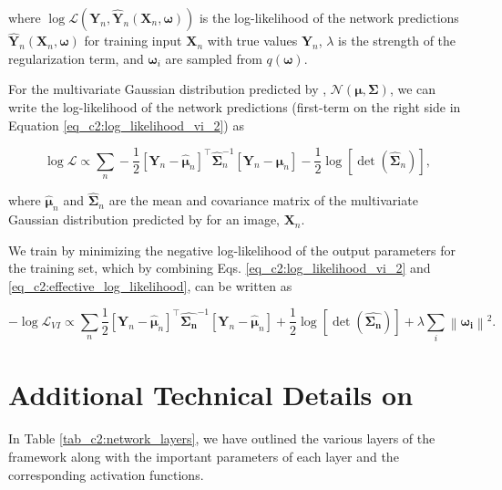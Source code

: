 \noindent
where $\log \mathcal{L}\left(\boldsymbol{Y}_{n}, \boldsymbol{\hat{Y}}_{n}\left(\boldsymbol{X}_{n}, \boldsymbol{\omega}\right)\right)$ is the log-likelihood of the network predictions $\boldsymbol{\hat{Y}}_{n}\left(\boldsymbol{X}_{n}, \boldsymbol{\omega}\right)$ for training input $\boldsymbol{X}_n$ with true values $\boldsymbol{Y}_n$, $\lambda$ is the strength of the regularization term, and $\boldsymbol{\omega}_i$ are sampled from $q(\boldsymbol{\omega})$. 

For the multivariate Gaussian distribution predicted by \gampen{}, $\mathcal{N}(\boldsymbol{\mu}, \boldsymbol{\Sigma})$, we can write the log-likelihood of the network predictions (first-term on the right side in Equation \ref{eq_c2:log_likelihood_vi_2}) as 

\begin{equation}
\log \mathcal{L} \propto  \sum_{n}  -\frac{1}{2}\left[\boldsymbol{Y}_{n}-\boldsymbol{\hat{\mu}}_{n}\right]^{\top} \boldsymbol{\hat{\Sigma}}_n^{-1}\left[\boldsymbol{Y}_{n}-\boldsymbol{\hat{\mu}}_{n}\right] -\frac{1}{2} \log [\operatorname{det}(\boldsymbol{\hat{\Sigma}}_n)] ,
\label{eq_c2:effective_log_likelihood}
\end{equation}

\noindent
where $\boldsymbol{\hat{\mu}}_n$ and $\boldsymbol{\hat{\Sigma}}_n$ are the mean and covariance matrix of the multivariate Gaussian distribution predicted by \gampen{} for an image, $\boldsymbol{X}_n$. 

We train \gampen{} by minimizing the negative log-likelihood of the output parameters for the training set, which by combining Eqs. \ref{eq_c2:log_likelihood_vi_2} and \ref{eq_c2:effective_log_likelihood}, can be written as

\begin{equation}
- \log \mathcal{L}_{VI} \propto  \sum_{n} \frac{1}{2}\left[\boldsymbol{Y}_{n}-\boldsymbol{\hat{\mu}}_{n}\right]^{\top} \boldsymbol{\hat{\Sigma_n}}^{-1}\left[\boldsymbol{Y}_{n}-\boldsymbol{\hat{\mu}}_{n}\right] + \frac{1}{2} \log [\operatorname{det}(\boldsymbol{\hat{\Sigma_n}})] + \lambda \sum_{i}\left\|\boldsymbol{\omega_{i}}\right\|^{2} .
\label{eq_c2:ap:final_loss_fn}
\end{equation}

\section{Additional Technical Details on \gampen{}}

In Table \ref{tab_c2:network_layers}, we have outlined the various layers of the \gampen{} framework along with the important parameters of each layer and the corresponding activation functions.


